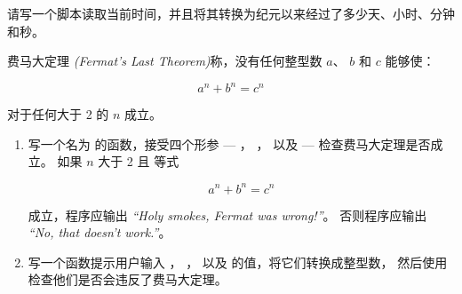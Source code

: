 {{{{\begin{exercise}
请写一个脚本读取当前时间，并且将其转换为纪元以来经过了多少天、小时、分钟和秒。

\end{exercise}


\begin{exercise}



%

费马大定理 {\em (Fermat’s Last Theorem)}称，没有任何整型数 $a$、 $b$ 和 $c$ 能够使：

\[ a^n + b^n = c^n \]

对于任何大于 2 的 $n$ 成立。

\begin{enumerate}



%

\item 写一个名为 {\em {}} 的函数，接受四个形参 --- {\em {}}， {\em {}}， {\em {}} 以及 {\em {}} --- 检查费马大定理是否成立。 如果 {\em $n$} 大于 2 且 等式

\[a^n + b^n = c^n \]

成立，程序应输出 {\em ``Holy smokes, Fermat was wrong!''}。  否则程序应输出 {\em ``No, that doesn’t work.''}。


\item 写一个函数提示用户输入 {\em {}}， {\em {}}， {\em {}}以及 {\em {}} 的值，将它们转换成整型数， 然后使用 {\em {}} 检查他们是否会违反了费马大定理。

\end{enumerate}


\end{exercise}}}}}

